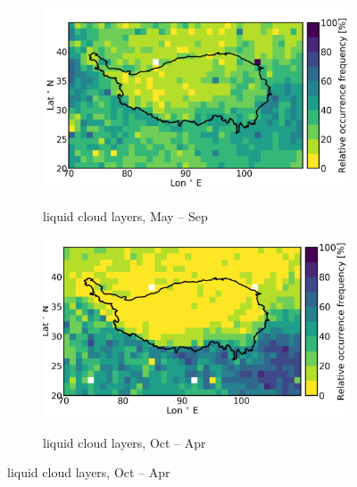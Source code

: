 \documentclass[alpha-refs]{wiley-article}
\begin{document}
\begin{figure}[!htbp]
    \begin{subfigure}[b]{0.5\textwidth}
       \centering
        \caption{liquid cloud layers, May -- Sep }       
        \includegraphics[width=\textwidth]{2B_CLDCLASS_liquid_monsoon.png}
        \label{fig:od5}
    \end{subfigure}%
    \begin{subfigure}[b]{0.5\textwidth}
        \centering
        \caption{liquid cloud layers, Oct -- Apr} 
        \includegraphics[width=\textwidth]{2B_CLDCLASS_liquid_westerly.png}
         \label{fig:od6}
    \end{subfigure}   
    

\end{figure}
\end{document}

